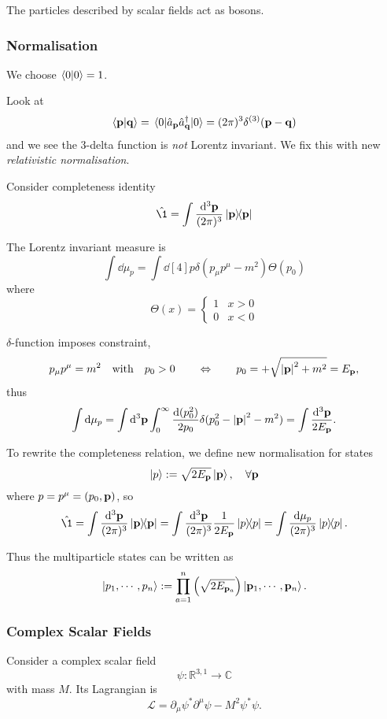 \documentclass[a4paper,11pt]{article}
\begin{document}
	The particles described by scalar fields act as bosons.

	\subsubsection{Normalisation}
	We choose $\braket{0}{0} = 1$. 

	Look at
	\[
		\braket{\vb p}{\vb q} = \mel{0}{\hat a _{\vb p}\hat a^\dagger _{\vb q}}{0} = (2 \pi)^3 \delta ^{(3)}(\vb p - \vb q)
	\]
	and we see the 3-delta function is \emph{not} Lorentz invariant. We fix this with new \emph{relativistic normalisation}.

	Consider completeness identity
	\[
		\hat \1 = \int \ddk{\vb p}{3} \dyad{\vb p}{\vb p}
	\]

	 The Lorentz invariant measure is
	\[
		\int \dd{\mu_p} = \int \dd[4]{p} \delta (p_\mu p^\mu - m^2) \Theta(p_0)
	\]
	where
	\[
		\Theta(x) = \begin{cases}
			1 & x>0\\
			0 & x<0
		\end{cases}
	\]
	
	$\delta$-function imposes constraint, 
	\[
		p_\mu p^\mu = m^2 \quad \text{with} \quad p_0 > 0 \qquad \Leftrightarrow \qquad p_0 = + \sqrt{\abs{\vb p}^2 + m^2} = E _{\vb p},
	\]
	thus
	\[
		\int \dd{\mu _p} = \int \dd[3]{\vb p} \int_{0}^{\infty} \frac{\dd{(p_0^2)}}{2p_0} \delta(p_0^2 - \abs{\vb p}^2 - m^2) = \int \frac{\dd[3]{\vb p}}{2 E _{\vb p}}.
	\]
	
	To rewrite the completeness relation, we define new normalisation for states
	\[
		\ket{p} := \sqrt{2 E _{\vb p}} \ket{\vb p}, \quad \forall \vb p
	\]
	where $p = p^\mu = (p_0, \vb p)$, so
	\[
		\hat \1 = \int \ddk{\vb p}{3} \dyad{\vb p}{\vb p} = \int \ddk{\vb p}{3} \frac{1}{2 E _{\vb p}} \dyad{p}{p} = \int \frac{\dd{\mu_p}}{(2 \pi)^3} \dyad{p}{p}.
	\]

	Thus the multiparticle states can be written as 
	\[
		\ket{p_1, \cdots, p_n} := \prod _{a = 1}^n \left( \sqrt{2 E _{\vb p_a}} \right) \ket{\vb p_1, \cdots, \vb p_n}.
	\]

	\subsubsection{Complex Scalar Fields}

	Consider a complex scalar field
	\[
		\psi : \mathbb{R}^{3,1} \to \mathbb{C}
	\]
	with mass $M$. Its Lagrangian is
	\[
		\mathcal{L} = \partial_\mu \psi^* \partial^\mu \psi - M^2 \psi^* \psi.
	\]
	
\end{document}
